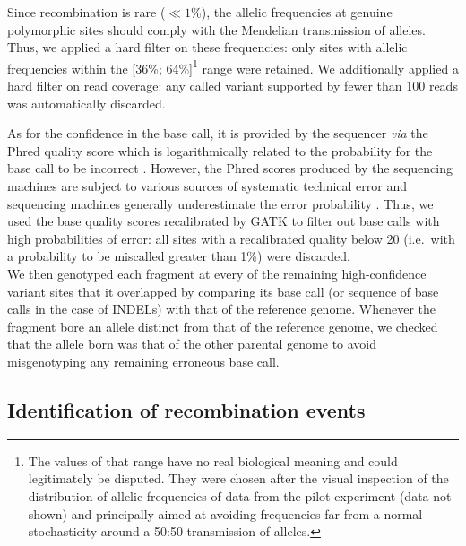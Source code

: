 Since recombination is rare ($\ll 1\%$), the allelic frequencies at genuine polymorphic sites should comply with the Mendelian transmission of alleles.
Thus, we applied a hard filter on these frequencies: only sites with allelic frequencies within the [36\%; 64\%]\footnote{The values of that range have no real biological meaning and could legitimately be disputed. They were chosen after the visual inspection of the distribution of allelic frequencies of data from the pilot experiment (data not shown) and principally aimed at avoiding frequencies far from a normal stochasticity around a 50:50 transmission of alleles.} range were retained.
We additionally applied a hard filter on read coverage: any called variant supported by fewer than 100 reads was automatically discarded.

As for the confidence in the base call, it is provided by the sequencer \textit{via} the Phred quality score which is logarithmically related to the probability for the base call to be incorrect \citep{ewing1998basecalling,ewing1998basecallinga}.
However, the Phred scores produced by the sequencing machines are subject to various sources of systematic technical error and sequencing machines generally underestimate the error probability \citep{gatk2012base}.
Thus, we used the base quality scores recalibrated by GATK to filter out base calls with high probabilities of error: all sites with a recalibrated quality below 20 (i.e.\ with a probability to be miscalled greater than 1\%) were discarded.\\


We then genotyped each fragment at every of the remaining high-confidence variant sites that it overlapped by comparing its base call (or sequence of base calls in the case of INDELs) with that of the reference genome.
Whenever the fragment bore an allele distinct from that of the reference genome, we checked that the allele born was that of the other parental genome to avoid misgenotyping any remaining erroneous base call.



\subsection{Identification of recombination events}

